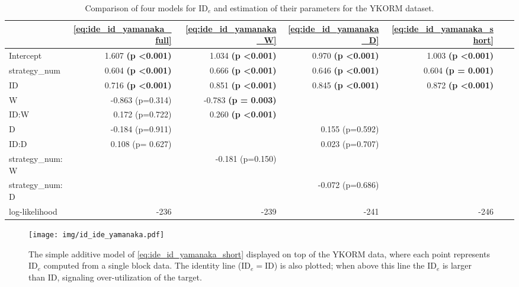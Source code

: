 \documentclass[acmlarge, manuscript,review]{acmart}
\newcommand{\ide}{\ensuremath{{\text{ID}_e}}\xspace}
\begin{document}
\begin{table}[htbp]
\begin{center}
	\caption{Comparison of four models for \ide and estimation of their parameters for the YKORM dataset.}
	\label{tab:ide_id_yamanaka}
	\begin{tabular}{lrrrrrr}
	\hline
				  &  \autoref{eq:ide_id_yamanaka_full} & \autoref{eq:ide_id_yamanaka_W} &      \autoref{eq:ide_id_yamanaka_D} & \autoref{eq:ide_id_yamanaka_short} \\
	\hline
	Intercept     &  1.607 \textbf{(p \textless 0.001)} &    1.034 \textbf{(p \textless 0.001)} &  0.970 \textbf{(p \textless 0.001)} &  1.003 \textbf{(p \textless 0.001)}\\
	strategy\_num &  0.604 \textbf{(p \textless 0.001)} &    0.666 \textbf{(p \textless 0.001)} & 0.646 \textbf{(p \textless 0.001)} & 0.604 \textbf{(p = 0.001)} \\
	ID            &  0.716  \textbf{(p \textless 0.001)} &    0.851 \textbf{(p \textless 0.001)} & 0.845 \textbf{(p \textless 0.001)}& 0.872 \textbf{(p \textless 0.001)}  \\
	W             & -0.863 (p=0.314) &  -0.783 \textbf{(p = 0.003)}   &  &    \\
	ID:W          &  0.172 (p=0.722) &    0.260 \textbf{(p \textless 0.001)} &    &        \\
	D             & -0.184 (p=0.911)&     & 0.155 (p=0.592) &  \\
	ID:D          &  0.108 (p= 0.627) &     &  0.023 (p=0.707) &    \\
	strategy\_num:W & & -0.181 (p=0.150) & & \\
	strategy\_num:D & &   & -0.072 (p=0.686) & \\
	log-likelihood & -236 & -239 & -241 & -246 \\
	\hline
	\end{tabular}
	\end{center}
\end{table}



\begin{figure}[htbp]
	\centering
	\texttt{[image: img/id\_ide\_yamanaka.pdf]}
	\caption{The simple additive model of \autoref{eq:ide_id_yamanaka_short} displayed on top of the YKORM data, where each point represents \ide computed from a single block data. The identity line ($\ide = \text{ID}$) is also plotted; when above this line the \ide is larger than ID, signaling over-utilization of the target.}
	\label{fig:id_ide_yamanaka}
\end{figure}
\end{document}

